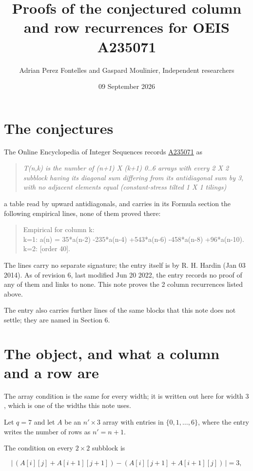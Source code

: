 \documentclass[11pt]{article}
\title{Proofs of the conjectured column and row recurrences for OEIS A235071}
\author{Adrian Perez Fontelles and Gaspard Moulinier, Independent researchers}
\date{09 September 2026}
\theoremstyle{definition}
\begin{document}
\maketitle
\section{The conjectures}

The Online Encyclopedia of Integer Sequences records \href{https://oeis.org/A235071}{A235071} as

\begin{quote}\itshape T(n,k) is the number of (n+1) X (k+1) 0..6 arrays with every 2 X 2 subblock having its diagonal sum differing from its antidiagonal sum by 3, with no adjacent elements equal (constant-stress tilted 1 X 1 tilings)\end{quote}

a table read by upward antidiagonals, and carries in its Formula section the following empirical lines, none of them proved there:

\begin{quote}\ttfamily Empirical for column k:\\
k=1: a(n) = 35*a(n-2) -235*a(n-4) +543*a(n-6) -458*a(n-8) +96*a(n-10).\\k=2: [order 40].\end{quote}

The lines carry no separate signature; the entry itself is by R. H. Hardin (Jan 03 2014). As of revision 6, last modified Jun 20 2022, the entry records no proof of any of them and links to none. This note proves the 2 column recurrences listed above.

The entry also carries further lines of the same blocks that this note does not settle; they are named in Section 6.

\section{The object, and what a column and a row are}

The array condition is the same for every width; it is written out here for width $3$, which is one of the widths this note uses.

Let $q = 7$ and let $A$ be an $n' \times 3$ array with entries in $\{0,1,\dots,6\}$, where the entry writes the number of rows as $n' = n + 1$.

The condition on every $2 \times 2$ subblock is

\[\bigl|\,(A[i][j] + A[i{+}1][j{+}1]) - (A[i][j{+}1] + A[i{+}1][j])\,\bigr| = 3,\]
\end{document}
